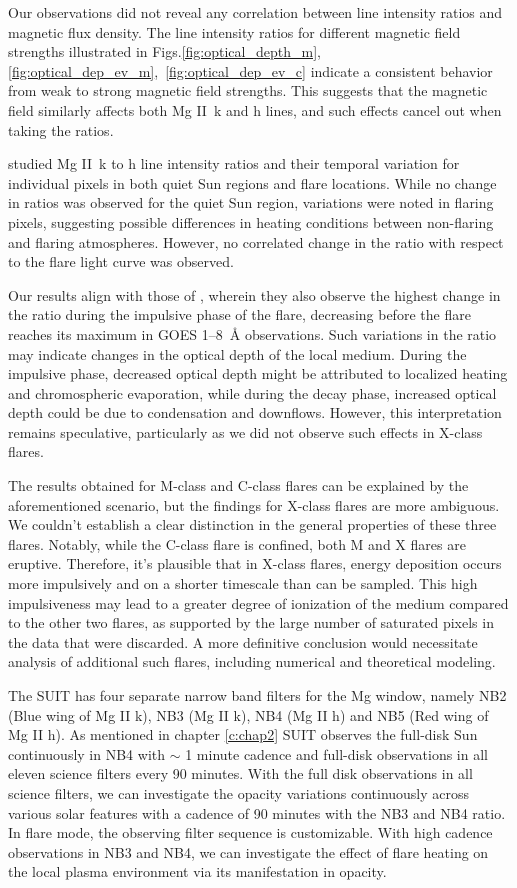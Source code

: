 Our observations did not reveal any correlation between line intensity ratios and magnetic flux density. The line intensity ratios for different magnetic field strengths illustrated in Figs.\ref{fig:optical_depth_m},\ref{fig:optical_dep_ev_m},~\ref{fig:optical_dep_ev_c} indicate a consistent behavior from weak to strong magnetic field strengths. This suggests that the magnetic field similarly affects both Mg II~k and h lines, and such effects cancel out when taking the ratios.

\cite{kerr15} studied Mg II~k to h line intensity ratios and their temporal variation for individual pixels in both quiet Sun regions and flare locations. While no change in ratios was observed for the quiet Sun region, variations were noted in flaring pixels, suggesting possible differences in heating conditions between non-flaring and flaring atmospheres. However, no correlated change in the ratio with respect to the flare light curve was observed.

Our results align with those of \cite{kerr15}, wherein they also observe the highest change in the ratio during the impulsive phase of the flare, decreasing before the flare reaches its maximum in GOES 1{--}8~{\AA} observations. Such variations in the ratio may indicate changes in the optical depth of the local medium. During the impulsive phase, decreased optical depth might be attributed to localized heating and chromospheric evaporation, while during the decay phase, increased optical depth could be due to condensation and downflows. However, this interpretation remains speculative, particularly as we did not observe such effects in X-class flares.

The results obtained for M-class and C-class flares can be explained by the aforementioned scenario, but the findings for X-class flares are more ambiguous. We couldn't establish a clear distinction in the general properties of these three flares. Notably, while the C-class flare is confined, both M and X flares are eruptive. Therefore, it's plausible that in X-class flares, energy deposition occurs more impulsively and on a shorter timescale than can be sampled. This high impulsiveness may lead to a greater degree of ionization of the medium compared to the other two flares, as supported by the large number of saturated pixels in the data that were discarded. A more definitive conclusion would necessitate analysis of additional such flares, including numerical and theoretical modeling.

The SUIT has four separate narrow band filters for the Mg window, namely NB2 (Blue wing of Mg II k), NB3 (Mg II k), NB4 (Mg II h) and NB5 (Red wing of Mg II h). As mentioned in chapter \ref{c:chap2} SUIT observes the full-disk Sun continuously in NB4 with $\sim$ 1 minute cadence and full-disk observations in all eleven science filters every 90 minutes. With the full disk observations in all science filters, we can investigate the opacity variations continuously across various solar features with a cadence of 90 minutes with the NB3 and NB4 ratio. In flare mode, the observing filter sequence is customizable. With high cadence observations in NB3 and NB4, we can investigate the effect of flare heating on the local plasma environment via its manifestation in opacity.